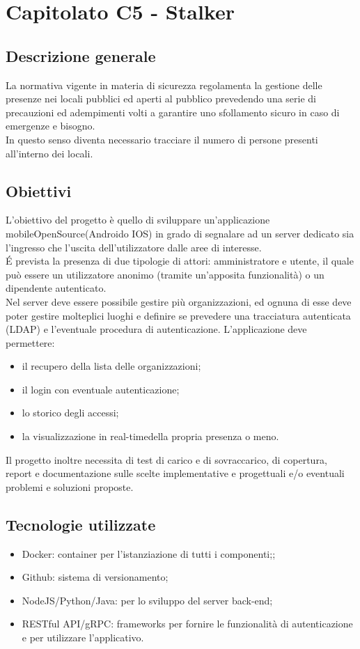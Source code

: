 \section{Capitolato C5 - Stalker}

\subsection{Descrizione generale}
La normativa vigente in materia di sicurezza regolamenta la gestione delle presenze nei locali pubblici ed aperti al pubblico prevedendo una serie di precauzioni ed adempimenti volti a garantire uno sfollamento sicuro in caso di emergenze e bisogno. \\ 
In questo senso diventa necessario tracciare il numero di persone presenti all’interno dei locali.

\subsection{Obiettivi}
L’obiettivo del progetto è quello di sviluppare un’applicazione mobile\glo OpenSource\glo (Android\glo o IOS\glo) in grado di segnalare ad un server dedicato sia l’ingresso che l’uscita dell’utilizzatore dalle aree di interesse. \\
\'E prevista la presenza di due tipologie di attori: amministratore e utente, il quale può essere un utilizzatore anonimo (tramite un'apposita funzionalità) o un dipendente autenticato. \\
Nel server deve essere possibile gestire più organizzazioni, ed ognuna di esse deve poter gestire molteplici luoghi e definire se prevedere una tracciatura autenticata (LDAP) e l’eventuale procedura di autenticazione.
L’applicazione deve permettere: \begin{itemize}
\item il recupero della lista delle organizzazioni;
\item il login con eventuale autenticazione;
\item lo storico degli accessi;
\item la visualizzazione in real-time\glo della propria presenza o meno.
\end{itemize}
Il progetto inoltre necessita di test di carico e di sovraccarico, di copertura, report e documentazione sulle scelte implementative e progettuali e/o eventuali problemi e soluzioni proposte.

\subsection{Tecnologie utilizzate}
\begin{itemize}
\item Docker: container per l’istanziazione di tutti i componenti;;
\item Github: sistema di versionamento\glo;
\item NodeJS/Python/Java: per lo sviluppo del server back-end\glo;
\item RESTful API/gRPC: frameworks per fornire le funzionalità di autenticazione e per utilizzare l’applicativo.
\end{itemize}

